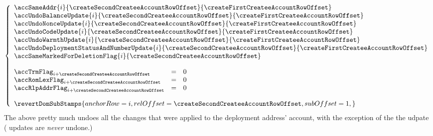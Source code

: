 \begin{description}
\[			\left\{ \begin{array}{lcl}
				\multicolumn{3}{l}{\accSameAddr                            {i}{\createSecondCreateeAccountRowOffset}{\createFirstCreateeAccountRowOffset}} \\ %
				\multicolumn{3}{l}{\accUndoBalanceUpdate                   {i}{\createSecondCreateeAccountRowOffset}{\createFirstCreateeAccountRowOffset}} \\ %
				\multicolumn{3}{l}{\accUndoNonceUpdate                     {i}{\createSecondCreateeAccountRowOffset}{\createFirstCreateeAccountRowOffset}} \\ %
				\multicolumn{3}{l}{\accUndoCodeUpdate                      {i}{\createSecondCreateeAccountRowOffset}{\createFirstCreateeAccountRowOffset}} \\ %
				\multicolumn{3}{l}{\accUndoWarmthUpdate                    {i}{\createSecondCreateeAccountRowOffset}{\createFirstCreateeAccountRowOffset}} \\ %
				\multicolumn{3}{l}{\accUndoDeploymentStatusAndNumberUpdate {i}{\createSecondCreateeAccountRowOffset}{\createFirstCreateeAccountRowOffset}} \\ %
				\multicolumn{3}{l}{\accSameMarkedForDeletionFlag           {i}{\createSecondCreateeAccountRowOffset}} \vspace{4mm}                         \\
				\accTrmFlag     _{i + \createSecondCreateeAccountRowOffset} & = & 0              \\ %
				\accRomLexFlag  _{i + \createSecondCreateeAccountRowOffset} & = & 0              \\ %
				\accRlpAddrFlag _{i + \createSecondCreateeAccountRowOffset} & = & 0 \vspace{4mm} \\ %
				\multicolumn{3}{l}{
					\revertDomSubStamps {
						anchorRow        = i                                   ,
						relOffset        = \createSecondCreateeAccountRowOffset,
						subOffset        = 1                                   ,
						}
					} \\
			\end{array} \right.
		\]
		\saNote{}
		The above pretty much undoes all the changes that were applied to the deployment address' account,
		with the exception of the
		the \accDeploymentStatus{} udpate (\accDeploymentNumber{} updates are \emph{never} undone.)
\end{description}
